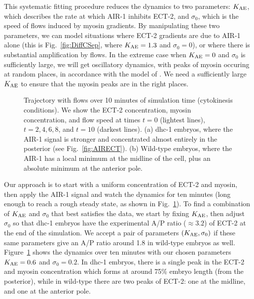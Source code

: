 \documentclass[11pt]{article}
\begin{document}
This systematic fitting procedure reduces the dynamics to two parameters: $K_\text{AE}$, which describes the rate at which AIR-1 inhibits ECT-2, and $\sigma_0$, which is the speed of flows induced by myosin gradients. By manipulating these two parameters, we can model situations where ECT-2 gradients are due to AIR-1 alone (this is Fig.\ \ref{fig:DiffCSep}, where $K_\text{AE}=1.3$ and $\sigma_0=0$), or where there is substantial amplification by flows. In the extreme case when $K_\text{AE}=0$ and $\sigma_0$ is sufficiently large, we will get oscillatory dynamics, with peaks of myosin occuring at random places, in accordance with the model of \cite{michaux2018excitable}. We need a sufficiently large $K_\text{AE}$ to ensure that the myosin peaks are in the right places.

\begin{figure}
\centering
{}
\caption{\label{fig:TryFlows} Trajectory with flows over 10 minutes of simulation time (cytokinesis conditions). We show the ECT-2 concentration, myosin concentration, and flow speed at times $t=0$ (lightest lines), $t=2,4,6,8$, and $t=10$ (darkest lines). (a) dhc-1 embryos, where the AIR-1 signal is stronger and concentrated almost entirely in the posterior (see Fig.\ \ref{fig:AIRECT}). (b) Wild-type embryos, where the AIR-1 has a local minimum at the midline of the cell, plus an absolute minimum at the anterior pole. }
\end{figure}

Our approach is to start with a uniform concentration of ECT-2 and myosin, then apply the AIR-1 signal and watch the dynamics for ten minutes (long enough to reach a rough steady state, as shown in Fig.\ \ref{fig:TryFlows}). To find a combination of $K_\text{AE}$ and $\sigma_0$ that best satisfies the data, we start by fixing $K_\text{AE}$, then adjust $\sigma_0$ so that dhc-1 embryos have the experimental A/P ratio ($\approx 3.2$) of ECT-2 at the end of the simulation. We accept a pair of parameters $\left(K_\text{AE},\sigma_0\right)$ if these same parameters give an A/P ratio around 1.8 in wild-type embryos as well. Figure\ \ref{fig:TryFlows} shows the dynamics over ten minutes with our chosen parameters $K_\text{AE}=0.6$ and $\sigma_0=0.2$. In dhc-1 embryos, there is a single peak in the ECT-2 and myosin concentration which forms at around 75\% embryo length (from the posterior), while in wild-type there are two peaks of ECT-2: one at the midline, and one at the anterior pole. 
\end{document}
